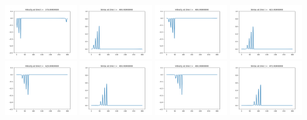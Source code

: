 \documentclass[11pt]{article}
\begin{document}
\includegraphics[width=0.2375\textwidth]{frame0015fig2.png}
\vskip 10pt 
\includegraphics[width=0.2375\textwidth]{frame0016fig1.png}
\includegraphics[width=0.2375\textwidth]{frame0016fig2.png}
\includegraphics[width=0.2375\textwidth]{frame0017fig1.png}
\includegraphics[width=0.2375\textwidth]{frame0017fig2.png}
\vskip 10pt 
\includegraphics[width=0.2375\textwidth]{frame0018fig1.png}
\includegraphics[width=0.2375\textwidth]{frame0018fig2.png}
\includegraphics[width=0.2375\textwidth]{frame0019fig1.png}
\end{document}
